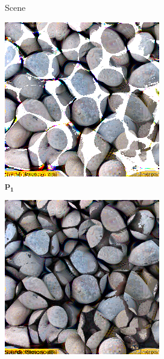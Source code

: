 \begin{figure}[ht]
\begin{subfigure}{\textwidth}
\begin{subfigure}{0.2\textwidth}
            \caption*{Scene}
            \label{fig:intro_pixels_vs_stats-pixels_bg}
        \end{subfigure}
        \hfill
        \begin{subfigure}{0.2\textwidth}
            \centering
            \includegraphics[width=\textwidth]{images/01-pixels_vs_stats-pixels_opt.jpg}
            \caption*{\(\bm{p_1}\)}
            \label{fig:intro_pixels_vs_stats-pixels_opt}
        \end{subfigure}
        \hfill
        \begin{subfigure}{0.2\textwidth}
            \centering
            \includegraphics[width=\textwidth]{images/01-pixels_vs_stats-pixels_proj.jpg}

\end{subfigure}
\end{subfigure}
\end{figure}
